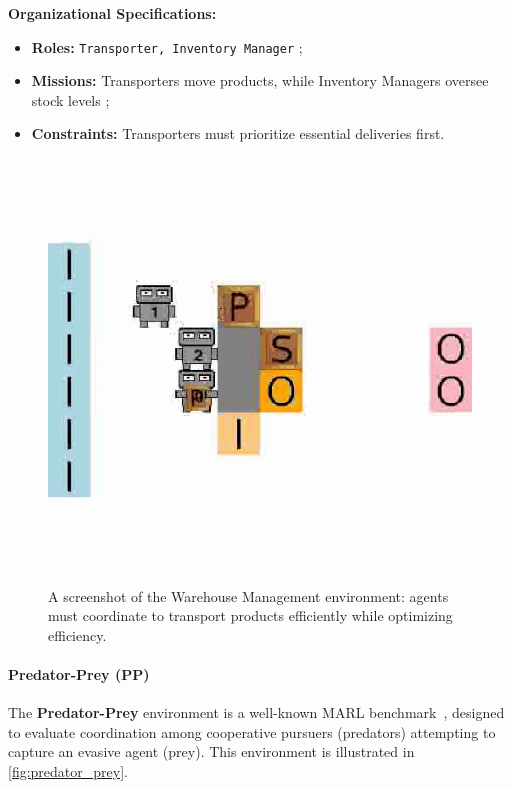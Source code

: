 \documentclass[pdflatex,sn-mathphys-num]{sn-jnl}%
\theoremstyle{thmstyleone}%
\theoremstyle{thmstyletwo}%
\theoremstyle{thmstylethree}%
\begin{document}
\textbf{Organizational Specifications:}
\begin{itemize}
    \item \textbf{Roles:} \texttt{Transporter, Inventory Manager} ;
    \item \textbf{Missions:} Transporters move products, while Inventory Managers oversee stock levels ;
    \item \textbf{Constraints:} Transporters must prioritize essential deliveries first.
\end{itemize}

\begin{figure}[h!]
    \centering
    \includegraphics[width=0.7\linewidth]{figures/wm.png}
    \caption{A screenshot of the Warehouse Management environment: agents must coordinate to transport products efficiently while optimizing efficiency.}
    \label{fig:warehouse}
\end{figure}

\paragraph{Predator-Prey (PP)}
The \textbf{Predator-Prey} environment is a well-known MARL benchmark~\cite{lowe2017multi}, designed to evaluate coordination among cooperative pursuers (predators) attempting to capture an evasive agent (prey). This environment is illustrated in \autoref{fig:predator_prey}.
\end{document}

